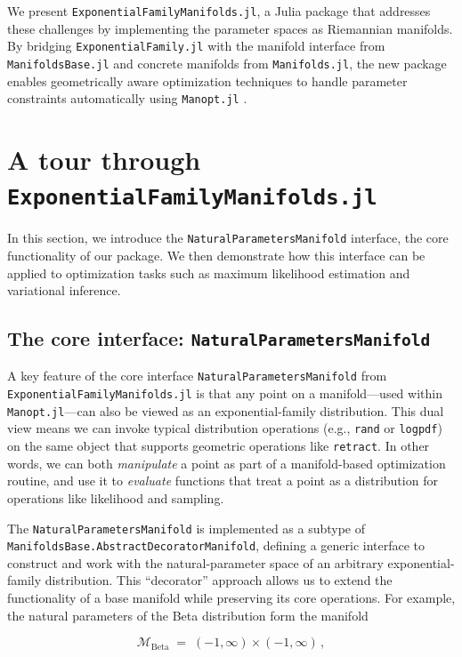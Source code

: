\documentclass{juliacon}
\begin{document}
We present \texttt{ExponentialFamilyManifolds.jl}, a Julia \cite{bezanson2017julia} package that addresses these challenges by implementing the parameter spaces as Riemannian manifolds. By bridging \texttt{ExponentialFamily.jl} \cite{Senoz_ExponentialFamily_jl_2023} with the manifold interface from \texttt{ManifoldsBase.jl} \cite{axen_manifoldsjl_2023} and concrete manifolds from \texttt{Manifolds.jl}, the new package enables geometrically aware optimization techniques to handle parameter constraints automatically using \texttt{Manopt.jl} \cite{bergmann_manoptjl_2022}.

\section{A tour through \texttt{ExponentialFamilyManifolds.jl}}
In this section, we introduce the \texttt{NaturalParametersManifold} interface, the core functionality of our package. We then demonstrate how this interface can be applied to optimization tasks such as maximum likelihood estimation and variational inference.

\subsection{The core interface: \texttt{NaturalParametersManifold}}

A key feature of the core interface \texttt{NaturalParametersManifold} from \texttt{ExponentialFamilyManifolds.jl} is that any point on a manifold—used within \texttt{Manopt.jl}—can also be viewed as an exponential-family distribution. This dual view means we can invoke typical distribution operations (e.g., \texttt{rand} or \texttt{logpdf}) on the same object that supports geometric operations like \texttt{retract}. In other words, we can both \emph{manipulate} a point as part of a manifold-based optimization routine, and use it to \emph{evaluate} functions that treat a point as a distribution for operations like likelihood and sampling.

The \texttt{NaturalParametersManifold} is implemented as a subtype of \texttt{ManifoldsBase.AbstractDecoratorManifold}, defining a generic interface to construct and work with the natural-parameter space of an arbitrary exponential-family distribution. This ``decorator'' approach allows us to extend the functionality of a base manifold while preserving its core operations. For example, the natural parameters of the Beta distribution form the manifold

\[
\mathcal{M}_{\mathrm{Beta}} \;=\; (-1,\infty) \times (-1,\infty)\,,
\]
\end{document}
